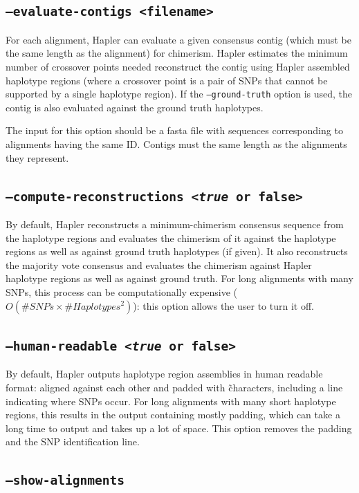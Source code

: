 \documentclass[11pt]{llncs}
\begin{document}
\subsection{\texttt{--evaluate-contigs <filename>}}

For each alignment, Hapler can evaluate a given consensus contig (which must be the same length as the alignment) for chimerism. Hapler
estimates the minimum number of crossover points needed reconstruct the contig using Hapler assembled haplotype regions (where a crossover
point is a pair of SNPs that cannot be supported by a single haplotype region). If the \texttt{--ground-truth} option is used, the contig is 
also evaluated against the ground truth haplotypes. 

The input for this option should be a fasta file with sequences corresponding to alignments having the same ID. Contigs must the same length
as the alignments they represent.

\subsection{\texttt{--compute-reconstructions <\emph{true} or false>}}

By default, Hapler reconstructs a minimum-chimerism consensus sequence from the haplotype regions and evaluates the chimerism of it against the
haplotype regions as well as against ground truth haplotypes (if given). It also reconstructs the majority vote consensus and evaluates the chimerism
against Hapler haplotype regions as well as against ground truth. For long alignments with many SNPs, this process can be computationally expensive 
($O(\#SNPs \times \#Haplotypes^2)$): this option allows the user to turn it off.

\subsection{\texttt{--human-readable <\emph{true} or false>}}

By default, Hapler outputs haplotype region assemblies in human readable format: aligned against each other and padded with \~ characters, including a line
indicating where SNPs occur. For long alignments with many short haplotype regions, this results in the output containing mostly padding, which can take
a long time to output and takes up a lot of space. This option removes the padding and the SNP identification line.


\subsection{\texttt{--show-alignments}}
\end{document}
